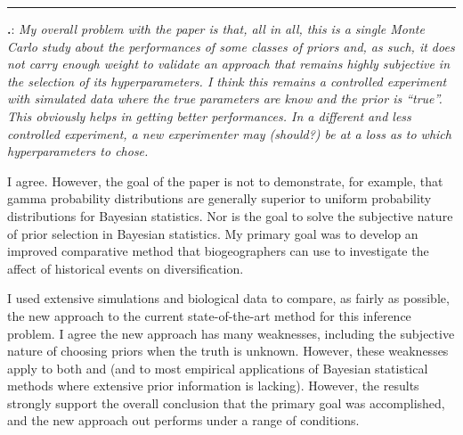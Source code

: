 \documentclass[12pt]{article}
\newcounter{commentCounter}
\newcommand{\revcomment}[1]{{\addtocounter{commentCounter}{1}}
    \medskip \hrule \noindent
\textbf{\arabic{section}.\arabic{commentCounter}}: {\sl #1}\par\xspace}
\newcommand{\response}[1]{{\addtolength{\leftskip}{0.25in} #1\par}\xspace}
\begin{document}
\revcomment{
    My overall problem with the paper is that, all in all, this is a single
    Monte Carlo study about the performances of some classes of priors and, as
    such, it does not carry enough weight to validate an approach that remains
    highly subjective in the selection of its hyperparameters. I think this
    remains a controlled experiment with simulated data where the true
    parameters are know and the prior is ``true''. This obviously helps in
    getting better performances. In a different and less controlled experiment,
    a new experimenter may (should?) be at a loss as to which hyperparameters
    to chose.
}
\response{
    I agree. However, the goal of the paper is not to demonstrate, for example,
    that gamma probability distributions are generally superior to uniform
    probability distributions for Bayesian statistics. Nor is the goal to
    solve the subjective nature of prior selection in Bayesian statistics.
    My primary goal was to develop an improved comparative method that
    biogeographers can use to investigate the affect of historical events on
    diversification.

    I used extensive simulations and biological data to compare, as fairly as
    possible, the new approach to the current state-of-the-art method for this
    inference problem. I agree the new approach has many weaknesses, including
    the subjective nature of choosing priors when the truth is unknown. However,
    these weaknesses apply to both \dppmsbayes and \msbayes (and to most
    empirical applications of Bayesian statistical methods where extensive
    prior information is lacking). However, the results strongly support
    the overall conclusion that the primary goal was accomplished, and the
    new approach out performs \msb under a range of conditions.
}
\end{document}
